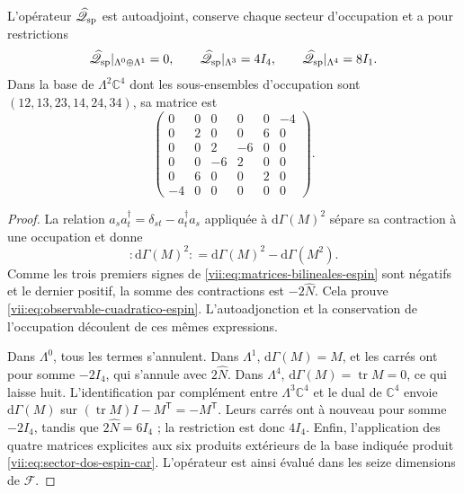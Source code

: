 \begin{proposition}
\label{vii:prop:operador-espin-car}
L'opérateur \(\widehat{\mathscr Q}_{\rm sp}\) est autoadjoint,
conserve chaque secteur d'occupation et a pour restrictions
\begin{equation}
 \widehat{\mathscr Q}_{\rm sp}|_{\Lambda^0\oplus\Lambda^1}=0,
 \qquad
 \widehat{\mathscr Q}_{\rm sp}|_{\Lambda^3}=4I_4,
 \qquad
 \widehat{\mathscr Q}_{\rm sp}|_{\Lambda^4}=8I_1.
 \label{vii:eq:sectores-espin-car}
\end{equation}
Dans la base de \(\Lambda^2\mathbb C^4\) dont les sous-ensembles d'occupation sont \((12,13,23,14,24,34)\), sa matrice est
\begin{equation}
 \begin{pmatrix}
 0&0&0&0&0&-4\\
 0&2&0&0&6&0\\
 0&0&2&-6&0&0\\
 0&0&-6&2&0&0\\
 0&6&0&0&2&0\\
 -4&0&0&0&0&0
 \end{pmatrix}.
 \label{vii:eq:sector-dos-espin-car}
\end{equation}
\end{proposition}
\begin{proof}
La relation \(a_s a_t^\dagger=\delta_{st}-a_t^\dagger a_s\)
appliquée à \(\mathrm d\Gamma(M)^2\) sépare sa contraction à
une occupation et donne
\[
 :\!\mathrm d\Gamma(M)^2\!:
 =\mathrm d\Gamma(M)^2-\mathrm d\Gamma(M^2).
\]
Comme les trois premiers signes de
\eqref{vii:eq:matrices-bilineales-espin} sont négatifs et le dernier
positif, la somme des contractions est \(-2\widehat N\).
Cela prouve \eqref{vii:eq:observable-cuadratico-espin}.
L'autoadjonction et la conservation de l'occupation découlent de
ces mêmes expressions.

Dans \(\Lambda^0\), tous les termes s'annulent. Dans \(\Lambda^1\), \(\mathrm d\Gamma(M)=M\), et les carrés ont pour somme \(-2I_4\), qui s'annule avec \(2\widehat N\). Dans \(\Lambda^4\), \(\mathrm d\Gamma(M)=\operatorname{tr}M=0\), ce qui laisse huit. L'identification par complément entre \(\Lambda^3\mathbb C^4\) et le dual de \(\mathbb C^4\) envoie \(\mathrm d\Gamma(M)\) sur \((\operatorname{tr}M)I-M^{\mathsf T}=-M^{\mathsf T}\). Leurs carrés ont à nouveau pour somme \(-2I_4\), tandis que \(2\widehat N=6I_4\) ; la restriction est donc \(4I_4\). Enfin, l'application des quatre matrices explicites aux six produits extérieurs de la base indiquée produit \eqref{vii:eq:sector-dos-espin-car}. L'opérateur est ainsi évalué dans les seize dimensions de \(\mathcal F\).
\end{proof}

